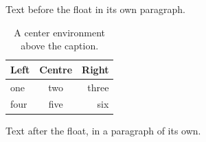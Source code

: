 \documentclass[12pt]{article}
\begin{document}
Text before the float in its own paragraph.

\begin{table}[h]
\begin{center}
\begin{tabular}{lcr}\hline Left & Centre & Right\\\hline one & two & three\\ four & five & six\\\hline\end{tabular}
\end{center}
\caption{A center environment above the caption.}
\end{table}

Text after the float, in a paragraph of its own.
\end{document}
